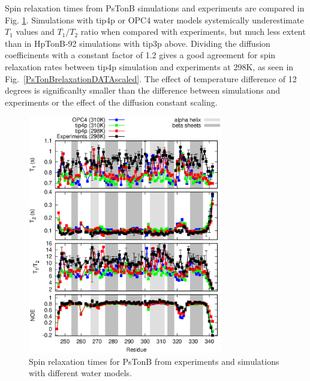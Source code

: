 \documentclass[pre,aps,floatfix,authordate1-4,twocolumn]{revtex4-1}
\begin{document}
Spin relaxation times from PsTonB simulations and experiments are 
compared in Fig. \ref{PsTonBrelaxationDATA}. Simulations with tip4p
or OPC4 water models systemically underestimate $T_1$ values
and $T_1/T_2$ ratio when compared with experiments, but much less
extent than in HpTonB-92 simulations with tip3p above. 
Dividing the diffusion coefficinents with a constant factor of 1.2 gives a good agreement for
spin relaxation rates between tip4p simulation and experiments at 298K,
as seen in Fig.~\ref{PsTonBrelaxationDATAscaled}.
The effect of temperature difference of 12 degrees is significanlty
smaller than the difference between simulations and experiments or the effect
of the diffusion constant scaling.
\begin{figure}[!h]
  \includegraphics[width=8.5cm]{../Figs/PsTonBrelaxationDATA.eps}%
  \caption{Spin relaxation times for PsTonB from experiments \cite{??}
    and simulations with different water models. 
    \label{PsTonBrelaxationDATA}}%
\end{figure}
\end{document}
